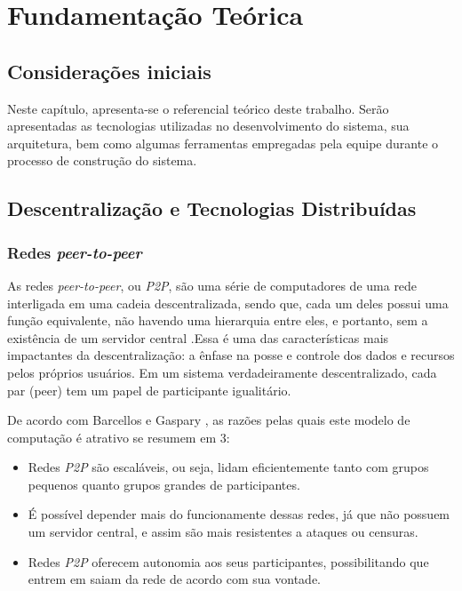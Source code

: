 \chapter[Fundamentação Teórica]{Fundamentação Teórica}
\label{cap:fundamentacao}

\section{Considerações iniciais}
Neste capítulo, apresenta-se o referencial teórico deste trabalho. Serão apresentadas as tecnologias utilizadas no desenvolvimento do sistema, sua arquitetura, bem como algumas ferramentas empregadas pela equipe durante o processo de construção do sistema.

\section{Descentralização e Tecnologias Distribuídas}
\subsection{Redes \textit{peer-to-peer}}
As redes \textit{peer-to-peer}, ou \textit{P2P}, são uma série de computadores de uma rede interligada em uma cadeia descentralizada, sendo que, cada um deles possui uma função equivalente, não havendo uma hierarquia entre eles, e portanto, sem a existência de um servidor central \cite{otton2007}.Essa é uma das características mais impactantes da descentralização: a ênfase na posse e controle dos dados e recursos pelos próprios usuários. Em um sistema verdadeiramente descentralizado, cada par (peer) tem um papel de participante igualitário. \cite{oram2002}

De acordo com Barcellos e Gaspary \cite{barcellos2006}, as razões pelas quais este modelo de computação é atrativo se resumem em 3:
\begin{itemize}
    \item Redes \textit{P2P} são escaláveis, ou seja, lidam eficientemente tanto com grupos pequenos quanto grupos grandes de participantes. 
    \item É possível depender mais do funcionamente dessas redes, já que não possuem um servidor central, e assim são mais resistentes a ataques ou censuras.
    \item Redes \textit{P2P} oferecem autonomia aos seus participantes, possibilitando que entrem em saiam da rede de acordo com sua vontade. 
\end{itemize}

